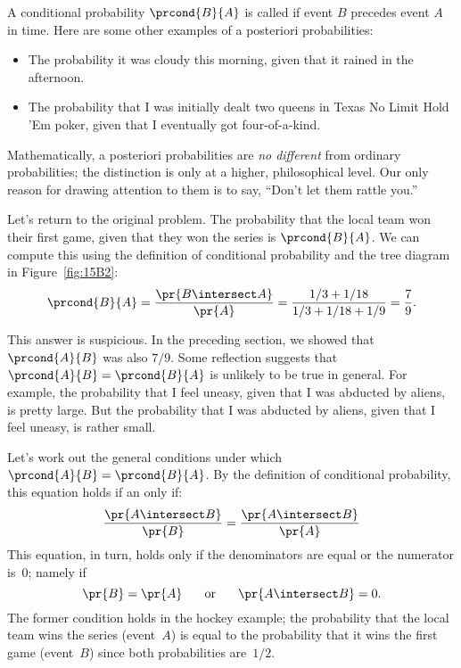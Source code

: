 A conditional probability $\prcond{B}{A}$ is called   if event $B$ precedes event $A$ in time.  Here are some
other examples of a posteriori probabilities:
%
\begin{itemize}
\item The probability it was cloudy this morning, given that it rained
in the afternoon.
\item The probability that I was initially dealt two queens in Texas
No Limit Hold 'Em poker, given that I eventually got four-of-a-kind.
\end{itemize}
%
Mathematically, a posteriori probabilities are \emph{no different}
from ordinary probabilities; the distinction is only at a higher,
philosophical level.  Our only reason for drawing attention to them is
to say, ``Don't let them rattle you.''

Let's return to the original problem.  The probability that the
local team won their first game, given that they won the series
is $\prcond{B}{A}$.  We can compute this using the definition of
conditional probability and the tree diagram in Figure~\ref{fig:15B2}:
%
\begin{align*}
\prcond{B}{A}  = \frac{\pr{B \intersect A}}{\pr{A}} %
               = \frac{1/3 + 1/18}{1/3 + 1/18 + 1/9} %
               = \frac{7}{9}.
\end{align*}

This answer is suspicious.  In the preceding section, we showed that
$\prcond{A}{B}$ was also $7/9$.  Some reflection suggests that
$\prcond{A}{B} = \prcond{B}{A}$ is unlikely to be true in general.
For example, the probability that I feel uneasy, given that I was
abducted by aliens, is pretty large.  But the probability that I was
abducted by aliens, given that I feel uneasy, is rather small.

Let's work out the general conditions under which $\prcond{A}{B} =
\prcond{B}{A}$.  By the definition of conditional probability, this
equation holds if an only if:
%
\[
\frac{\pr{A \intersect B}}{\pr{B}} = \frac{\pr{A \intersect B}}{\pr{A}}
\]
%
This equation, in turn, holds only if the denominators are equal or
the numerator is~0; namely if
%
\[
\pr{B} = \pr{A}
\hspace{0.25in} \text{or} \hspace{0.25in}
\pr{A \intersect B} = 0.
\]
%
The former condition holds in the hockey example; the probability that
the local team wins the series (event~$A$) is equal to the
probability that it wins the first game (event~$B$) since both
probabilities are~$1/2$.

